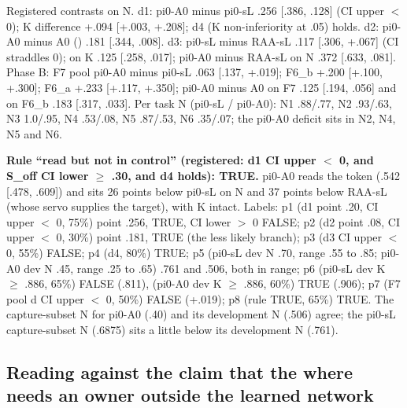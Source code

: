 Registered contrasts on N. d1: pi0-A0 minus pi0-sL \mi.256 [\mi.386, \mi.128] (CI upper $<$ 0); K difference +.094 [+.003, +.208]; d4 (K non-inferiority at \mi.05) holds. d2: pi0-A0 minus A0 (\pifive) \mi.181 [\mi.344, \mi.008]. d3: pi0-sL minus RAA-sL \mi.117 [\mi.306, +.067] (CI straddles 0); on K \mi.125 [\mi.258, \mi.017]; pi0-A0 minus RAA-sL on N \mi.372 [\mi.633, \mi.081]. Phase B: F7 pool pi0-A0 minus pi0-sL \mi.063 [\mi.137, +.019]; F6\_b +.200 [+.100, +.300]; F6\_a +.233 [+.117, +.350]; pi0-A0 minus A0 on F7 \mi.125 [\mi.194, \mi.056] and on F6\_b \mi.183 [\mi.317, \mi.033]. Per task N (pi0-sL / pi0-A0): N1 .88/.77, N2 .93/.63, N3 1.0/.95, N4 .53/.08, N5 .87/.53, N6 .35/.07; the pi0-A0 deficit sits in N2, N4, N5 and N6.

\textbf{Rule ``read but not in control'' (registered: d1 CI upper $<$ 0, and S\_off CI lower $\geq$ .30, and d4 holds): TRUE.} pi0-A0 reads the token (.542 [.478, .609]) and sits 26 points below pi0-sL on N and 37 points below RAA-sL (whose servo supplies the target), with K intact. Labels: p1 (d1 point \mi.20, CI upper $<$ 0, 75\%) point \mi.256, TRUE, CI lower $>$ 0 FALSE; p2 (d2 point \mi.08, CI upper $<$ 0, 30\%) point \mi.181, TRUE (the less likely branch); p3 (d3 CI upper $<$ 0, 55\%) FALSE; p4 (d4, 80\%) TRUE; p5 (pi0-sL dev N .70, range .55 to .85; pi0-A0 dev N .45, range .25 to .65) .761 and .506, both in range; p6 (pi0-sL dev K $\geq$ .886, 65\%) FALSE (.811), (pi0-A0 dev K $\geq$ .886, 60\%) TRUE (.906); p7 (F7 pool d CI upper $<$ 0, 50\%) FALSE (+.019); p8 (rule TRUE, 65\%) TRUE. The capture-subset N for pi0-A0 (.40) and its development N (.506) agree; the pi0-sL capture-subset N (.6875) sits a little below its development N (.761).

\subsection{Reading against the claim that the where needs an owner outside the learned network}
\label{app:K5}

